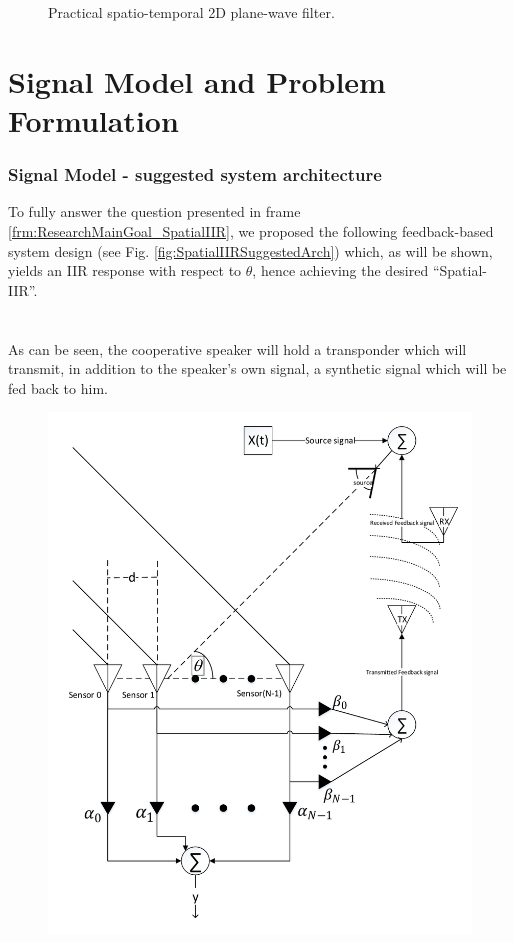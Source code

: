 \documentclass[10pt,pdflatex,headrule,landscape]{beamer}
\begin{document}
\begin{frame}
\begin{minipage}{0.18\textwidth}
\begin{figure}
\caption{Practical spatio-temporal 2D plane-wave filter.}
\label{fig:SpatioTemporalPlaneWavePracticalFilter}
\end{figure}
\end{minipage}
\end{frame}

\section{Signal Model and Problem Formulation}

\begin{frame}
\frametitle{Signal Model - suggested system architecture}
\begin{minipage}{0.55\textwidth}
To fully answer the question presented in frame \ref{frm:ResearchMainGoal_SpatialIIR}, we proposed the following feedback-based system design (see Fig. \ref{fig:SpatialIIRSuggestedArch}) which, as will be shown, yields an IIR response with respect to $ \theta $, hence achieving the desired ``Spatial-IIR''.
\\
\\
\\
As can be seen, the cooperative speaker will hold a transponder which will transmit, in addition to the speaker's own signal, a synthetic signal which will be fed back to him. 
\end{minipage}
\begin{minipage}{0.44\textwidth}
\begin{figure}
\includegraphics[width=\textwidth]{./Media/SpatialIIR-diagram/SpatialIIR_VER4.pdf}

\end{figure}
\end{minipage}
\end{frame}
\end{document}
